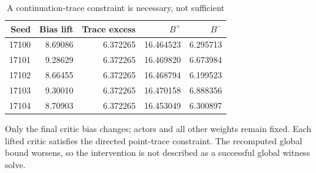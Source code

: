 \begin{table}[htbp]
\centering\small
\caption{A continuation-trace constraint is necessary, not sufficient}\label{tab:r19intervention}
\begin{tabular}{rrrrr}\toprule
Seed & Bias lift & Trace excess & $B^+$ & $B^-$\\
\midrule
17100 & 8.69086 & 6.372265 & 16.464523 & 6.295713\\
17101 & 9.28629 & 6.372265 & 16.469820 & 6.673984\\
17102 & 8.66455 & 6.372265 & 16.468794 & 6.199523\\
17103 & 9.30010 & 6.372265 & 16.470158 & 6.888356\\
17104 & 8.70903 & 6.372265 & 16.453049 & 6.300897\\
\bottomrule
\end{tabular}
\par\smallskip\begin{minipage}{.98\textwidth}\footnotesize Only the final critic bias changes; actors and all other weights remain fixed. Each lifted critic satisfies the directed point-trace constraint. The recomputed global bound worsens, so the intervention is not described as a successful global witness solve.\end{minipage}
\end{table}
